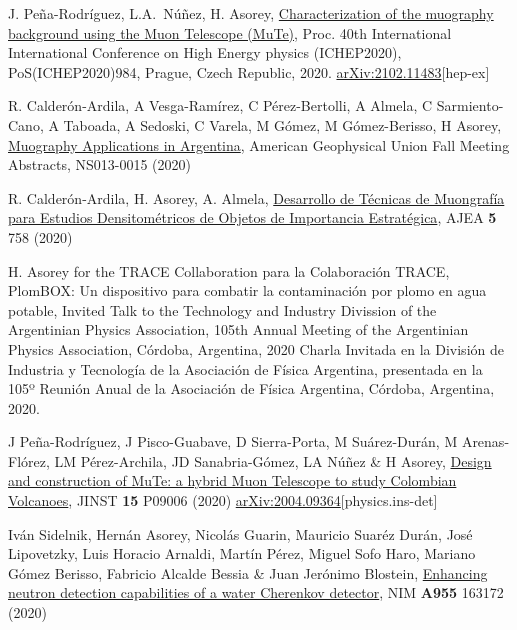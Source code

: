 \begin{etaremune}
\item {} J. Peña-Rodríguez, L.A.\ Núñez, H. Asorey, \href{https://doi.org/10.22323/1.390.0984}{Characterization of the muography background using the Muon Telescope (MuTe)}, \en Proc.
40th International International Conference on High Energy physics (ICHEP2020), PoS(ICHEP2020)984, Prague,  Czech Republic, 2020. \href{http://arxiv.org/abs/2102.11483}{arXiv:2102.11483}[hep-ex]

\item {} R. Calderón-Ardila, A Vesga-Ramírez, C Pérez-Bertolli, A Almela, C Sarmiento-Cano, A Taboada, A Sedoski, C Varela, M Gómez, M Gómez-Berisso, H Asorey, \href{https://ui.adsabs.harvard.edu/abs/2020AGUFMNS0130015C/abstract}{Muography Applications in Argentina}, American Geophysical Union Fall Meeting Abstracts, NS013-0015 (2020)

\item {} R. Calderón-Ardila, H. Asorey, A. Almela, \href{https://doi.org/10.33414/ajea.5.758.2020}{Desarrollo de Técnicas de Muongrafía para Estudios Densitométricos de Objetos de Importancia Estratégica}, AJEA {\textbf{5}} 758 (2020)

\item {} H. Asorey \ifeng for the TRACE Collaboration \else para la Colaboración TRACE\fi, PlomBOX: Un dispositivo para combatir la contaminación por plomo en agua potable, \ifeng Invited Talk to the Technology and Industry Divission of the Argentinian Physics Association, 105th Annual Meeting of the Argentinian Physics Association, Córdoba, Argentina, 2020 \else Charla Invitada en la División de Industria y Tecnología de la Asociación de Física Argentina, presentada en la 105º Reunión Anual de la Asociación de Física Argentina, Córdoba, Argentina, 2020.\fi

\item {} J Peña-Rodríguez, J Pisco-Guabave, D Sierra-Porta, M Suárez-Durán, M Arenas-Flórez, LM Pérez-Archila, JD Sanabria-Gómez, LA Núñez \& H Asorey, \href{https://doi.org/10.1088/1748-0221/15/09/P09006}{{Design and construction of MuTe: a hybrid Muon Telescope to study Colombian Volcanoes}}, JINST {\textbf{15}} P09006 (2020) \href{https://arxiv.org/abs/2004.09364}{arXiv:2004.09364}[physics.ins-det]

\item {} Iván Sidelnik, Hernán Asorey, Nicolás Guarin, Mauricio Suaréz Durán, José Lipovetzky, Luis Horacio Arnaldi, Martín Pérez, Miguel Sofo Haro, Mariano Gómez Berisso, Fabricio Alcalde Bessia \& Juan Jerónimo Blostein, \href{https://doi.org/10.1016/j.nima.2019.163172}{{Enhancing neutron detection capabilities of a water Cherenkov detector}}, NIM {\textbf{A955}} 163172 (2020) %


\end{etaremune}
